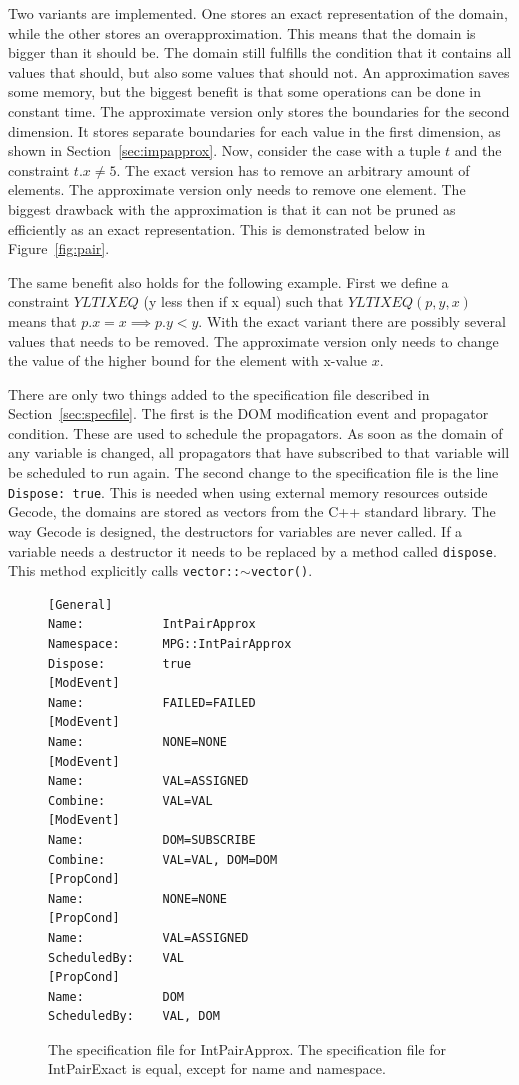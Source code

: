 \documentclass[a4paper,11pt]{article}
\begin{document}
Two variants are implemented. One stores an exact representation of the domain, while the other stores an overapproximation. This means that the domain is bigger than it should be. The domain still fulfills the condition that it contains all values that should, but also some values that should not. An approximation saves some memory, but the biggest benefit is that some operations can be done in constant time. The approximate version only stores the boundaries for the second dimension. It stores separate boundaries for each value in the first dimension, as shown in Section~\ref{sec:impapprox}. Now, consider the case with a tuple $t$ and the constraint $t.x\neq5$. The exact version has to remove an arbitrary amount of elements. The approximate version only needs to remove one element. The biggest drawback with the approximation is that it can not be pruned as efficiently as an exact representation. This is demonstrated below in Figure~\ref{fig:pair}.




The same benefit also holds for the following example. First we define a constraint $YLTIXEQ$ (y less then if x equal) such that $YLTIXEQ(p, y, x)$ means that $p.x=x\implies p.y<y$. With the exact variant there are possibly several values that needs to be removed. The approximate version only needs to change the value of the higher bound for the element with x-value $x$.

There are only two things added to the specification file described in Section~\ref{sec:specfile}. The first is the DOM modification event and propagator condition. These are used to schedule the propagators. As soon as the domain of any variable is changed, all propagators that have subscribed to that variable will be scheduled to run again. The second change to the specification file is the line \texttt{Dispose: true}. This is needed when using external memory resources outside Gecode, the domains are stored as vectors from the C++ standard library. The way Gecode is designed, the destructors for variables are never called. If a variable needs a destructor it needs to be replaced by a method called \texttt{dispose}. This method explicitly calls \texttt{vector::$\sim$vector()}.

\begin{figure}[H]
\begin{minipage}{\linewidth}
\begin{lstlisting}[frame=single]
[General]
Name:           IntPairApprox
Namespace:      MPG::IntPairApprox
Dispose:        true
[ModEvent]
Name:           FAILED=FAILED
[ModEvent]
Name:           NONE=NONE
[ModEvent]
Name:           VAL=ASSIGNED
Combine:        VAL=VAL
[ModEvent]
Name:           DOM=SUBSCRIBE
Combine:        VAL=VAL, DOM=DOM
[PropCond]
Name:           NONE=NONE
[PropCond]
Name:           VAL=ASSIGNED
ScheduledBy:    VAL
[PropCond]
Name:           DOM
ScheduledBy:    VAL, DOM
\end{lstlisting}
\end{minipage}
\caption{The specification file for IntPairApprox. The specification file for IntPairExact is equal, except for name and namespace.}
\end{figure}
\end{document}
